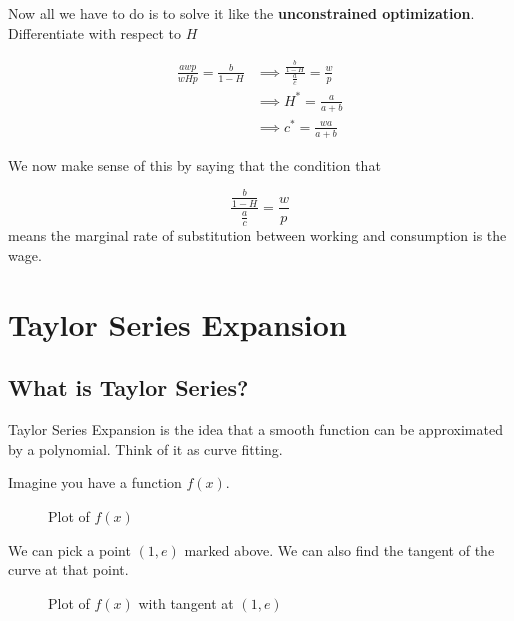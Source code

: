 \documentclass[11pt]{scrartcl}
\begin{document}
Now all we have to do is to solve it like the \textbf{unconstrained optimization}. Differentiate with respect to $H$

\begin{align*}
\frac{awp}{wHp} =\frac{b}{1-H} &\implies \frac{\frac{b}{1-H}}{\frac{a}{c}}=\frac{w}{p} \\
&\implies H^*=\frac{a}{a+b} \\
& \implies c^{\ast }=\frac{wa}{a+b}
\end{align*}

We now make sense of this by saying that the condition that 

\[ \frac{\frac{b}{1-H}}{\frac{a}{c}}=\frac{w}{p}\]means the marginal rate of substitution between working and consumption is the wage.

\section{Taylor Series Expansion}

\subsection{What is Taylor Series?}

Taylor Series Expansion is the idea that a smooth function can be approximated by a polynomial. Think of it as curve fitting.

Imagine you have a function $f(x)$.

\begin{figure}[ht!]
\centering
{}
\caption{Plot of $f(x)$}
\end{figure}

We can pick a point $(1, e)$ marked above. We can also find the tangent of the curve at that point.

\begin{figure}[ht!]
\centering
{}
\caption{Plot of $f(x)$ with tangent at $(1, e)$}
\end{figure}
\end{document}
